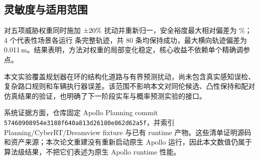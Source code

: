 \subsection{灵敏度与适用范围}

对五项威胁权重同时施加 $\pm20\%$ 扰动并重新归一，安全裕度最大相对偏差为 \SensWorstRelDev\%；4 个代表性场景各运行 \SensTrajectoryTrialCount 条完整轨迹，共 80 条均保持成功，最大横向轨迹偏差为 0.011\,m。结果表明，方法对权重的局部变化稳定，核心收益不依赖单个精确调参点。

本文实验覆盖规划器在环的结构化道路与有界预测扰动，尚未包含真实感知误检、复杂路口规则和车辆执行器误差。该范围不影响本文对同伦候选、凸性保持和配对仿真结果的验证，也明确了下一阶段实车与概率预测实验的接口。

系统证据方面，仓库固定 Apollo Planning commit
\texttt{57460908954e3188f640a813d26180e862d62a5f}，并索引 Planning/CyberRT/Dreamview
fixture 与已有 runtime 产物。这些清单证明源码和资产来源；本次论文重建没有重新启动原生 Apollo 运行，因此本文数值仍属于算法级结果，不把它们表述为原生 Apollo runtime 性能。
